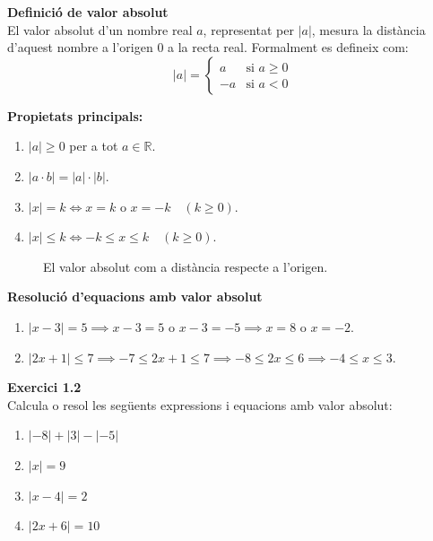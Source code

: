 \documentclass[12pt]{article}
\begin{document}
\begin{concept}
\textbf{Definició de valor absolut}\\
El valor absolut d'un nombre real $a$, representat per $|a|$, mesura la distància d'aquest nombre a l'origen $0$ a la recta real. Formalment es defineix com:
\[ |a| = \begin{cases} a & \text{si } a \ge 0 \\ -a & \text{si } a < 0 \end{cases} \]

\textbf{Propietats principals:}
\begin{enumerate}
    \item $|a| \ge 0$ per a tot $a \in \mathbb{R}$.
    \item $|a \cdot b| = |a| \cdot |b|$.
    \item $|x| = k \iff x = k \text{ o } x = -k \quad (k \ge 0)$.
    \item $|x| \le k \iff -k \le x \le k \quad (k \ge 0)$.
\end{enumerate}

\begin{figure}[H]
\centering
{}
\caption{El valor absolut com a distància respecte a l'origen.}
\end{figure}
\end{concept}

\begin{exemple}
\textbf{Resolució d'equacions amb valor absolut}
\begin{enumerate}[label=\alph*)]
    \item $|x - 3| = 5 \implies x - 3 = 5 \text{ o } x - 3 = -5 \implies x = 8 \text{ o } x = -2$.
    \item $|2x + 1| \le 7 \implies -7 \le 2x + 1 \le 7 \implies -8 \le 2x \le 6 \implies -4 \le x \le 3$.
\end{enumerate}
\end{exemple}

\begin{exercici}
\textbf{Exercici 1.2}\\
Calcula o resol les següents expressions i equacions amb valor absolut:
\begin{enumerate}[label=\alph*)]
    \item $|-8| + |3| - |-5|$
    \item $|x| = 9$
    \item $|x - 4| = 2$
    \item $|2x + 6| = 10$
\end{enumerate}
\end{exercici}
\end{document}
